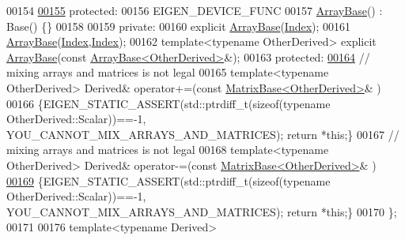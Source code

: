 \begin{DoxyCode}
00154 
\hyperlink{group___core___module_ab520a5e364380a10d471534c1e3d2253}{00155}   \textcolor{keyword}{protected}:
00156     EIGEN\_DEVICE\_FUNC
00157     \hyperlink{group___core___module_class_eigen_1_1_array_base}{ArrayBase}() : Base() \{\}
00158 
00159   \textcolor{keyword}{private}:
00160     \textcolor{keyword}{explicit} \hyperlink{group___core___module_class_eigen_1_1_array_base}{ArrayBase}(\hyperlink{namespace_eigen_a62e77e0933482dafde8fe197d9a2cfde}{Index});
00161     \hyperlink{group___core___module_class_eigen_1_1_array_base}{ArrayBase}(\hyperlink{namespace_eigen_a62e77e0933482dafde8fe197d9a2cfde}{Index},\hyperlink{namespace_eigen_a62e77e0933482dafde8fe197d9a2cfde}{Index});
00162     \textcolor{keyword}{template}<\textcolor{keyword}{typename} OtherDerived> \textcolor{keyword}{explicit} \hyperlink{group___core___module_class_eigen_1_1_array_base}{ArrayBase}(\textcolor{keyword}{const} 
      \hyperlink{group___core___module_class_eigen_1_1_array_base}{ArrayBase<OtherDerived>}&);
00163   \textcolor{keyword}{protected}:
\hyperlink{group___core___module_a09aadb6a71f9293d19c638598a418c92}{00164}     \textcolor{comment}{// mixing arrays and matrices is not legal}
00165     \textcolor{keyword}{template}<\textcolor{keyword}{typename} OtherDerived> Derived& operator+=(\textcolor{keyword}{const} 
      \hyperlink{group___core___module_class_eigen_1_1_matrix_base}{MatrixBase<OtherDerived>}& )
00166     \{EIGEN\_STATIC\_ASSERT(std::ptrdiff\_t(\textcolor{keyword}{sizeof}(\textcolor{keyword}{typename} OtherDerived::Scalar))==-1,
      YOU\_CANNOT\_MIX\_ARRAYS\_AND\_MATRICES); \textcolor{keywordflow}{return} *\textcolor{keyword}{this};\}
00167     \textcolor{comment}{// mixing arrays and matrices is not legal}
00168     \textcolor{keyword}{template}<\textcolor{keyword}{typename} OtherDerived> Derived& operator-=(\textcolor{keyword}{const} 
      \hyperlink{group___core___module_class_eigen_1_1_matrix_base}{MatrixBase<OtherDerived>}& )
\hyperlink{group___core___module_aa978767ac25c6d708d7ac41524f75252}{00169}     \{EIGEN\_STATIC\_ASSERT(std::ptrdiff\_t(\textcolor{keyword}{sizeof}(\textcolor{keyword}{typename} OtherDerived::Scalar))==-1,
      YOU\_CANNOT\_MIX\_ARRAYS\_AND\_MATRICES); \textcolor{keywordflow}{return} *\textcolor{keyword}{this};\}
00170 \};
00171 
00176 \textcolor{keyword}{template}<\textcolor{keyword}{typename} Derived>

\end{DoxyCode}
